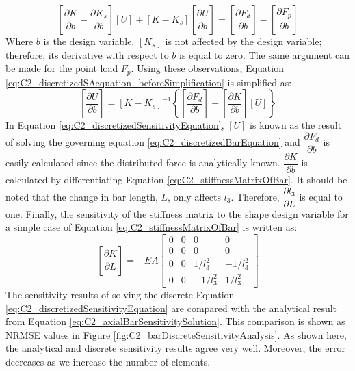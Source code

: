 %
\begin{equation}\label{eq:C2_discretizedSAequation_beforeSimplification}
    \left[ \frac{\partial K}{\partial b} - \frac{\partial K_s}{\partial b} \right] [U] + 
    [K - K_s] \left[ \frac{\partial U}{\partial b} \right] = 
    \left[ \frac{\partial F_d}{\partial b} \right] - 
    \left[ \frac{\partial F_p}{\partial b} \right]
\end{equation}
%
Where $b$ is the design variable. $[K_s]$ is not affected by the design variable; therefore, its derivative with respect to $b$ is equal to zero. The same argument can be made for the point load $F_p$. Using these observations, Equation \eqref{eq:C2_discretizedSAequation_beforeSimplification} is simplified as:
%
\begin{equation}\label{eq:C2_discretizedSensitivityEquation}
    \left[ \frac{\partial U}{\partial b} \right] = 
    [K - K_s]^{-1}
    \left\{
    \left[ \frac{\partial F_d}{\partial b} \right] - \left[ \frac{\partial K}{\partial b} \right] [U]
    \right\}
\end{equation}
%
In Equation \eqref{eq:C2_discretizedSensitivityEquation}, $[U]$ is known as the result of solving the governing equation \eqref{eq:C2_discretizedBarEquation} and $\dfrac{\partial F_d}{\partial b}$ is easily calculated since the distributed force is analytically known. $\dfrac{\partial K}{\partial b}$ is calculated by differentiating Equation \eqref{eq:C2_stiffnessMatrixOfBar}. It should be noted that the change in bar length, $L$, only affects $l_3$. Therefore, $\dfrac{\partial l_3}{\partial L}$ is equal to one. Finally, the sensitivity of the stiffness matrix to the shape design variable for a simple case of Equation \eqref{eq:C2_stiffnessMatrixOfBar} is written as:
%
\begin{equation}\label{eq:C2_sensitivityOfStiffnessMatrixOfBar}
    \left[ \frac{\partial K}{\partial L} \right] = 
    -EA
    \begin{bmatrix}
    0 & 0 & 0 & 0 \\
    0 & 0 & 0 & 0 \\
    0 & 0 & 1/l_3^2 & -1/l_3^2 \\
    0 & 0 & -1/l_3^2 & 1/l_3^2
    \end{bmatrix}
\end{equation}
%
The sensitivity results of solving the discrete Equation \eqref{eq:C2_discretizedSensitivityEquation} are compared with the analytical result from Equation \eqref{eq:C2_axialBarSensitivitySolution}. This comparison is shown as NRMSE values in Figure \ref{fig:C2_barDiscreteSensitivityAnalysis}. As shown here, the analytical and discrete sensitivity results agree very well. Moreover, the error decreases as we increase the number of elements.
